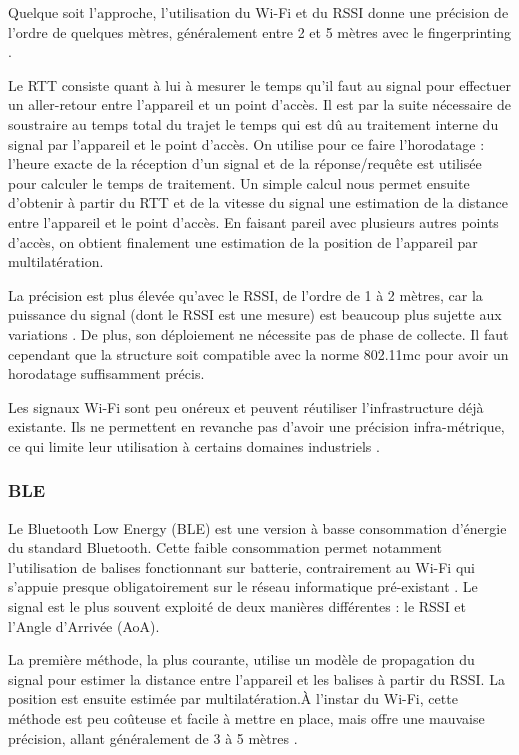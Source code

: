 \documentclass[11pt, a4paper]{article}
\begin{document}
Quelque soit l’approche, l’utilisation du Wi-Fi et du RSSI donne une précision de l’ordre de quelques mètres, généralement entre 2 et 5 mètres avec le fingerprinting \cite{daiSurveyLatestWiFi2023}.

Le RTT consiste quant à lui à mesurer le temps qu’il faut au signal pour effectuer un aller-retour entre l’appareil et un point d’accès. Il est par la suite nécessaire de soustraire au temps total du trajet le temps qui est dû au traitement interne du signal par l’appareil et le point d’accès. On utilise pour ce faire l’horodatage : l’heure exacte de la réception d’un signal et de la réponse/requête est utilisée pour calculer le temps de traitement. Un simple calcul nous permet ensuite d’obtenir à partir du RTT et de la vitesse du signal une estimation de la distance entre l’appareil et le point d’accès. En faisant pareil avec plusieurs autres points d’accès, on obtient finalement une estimation de la position de l’appareil par multilatération.

La précision est plus élevée qu’avec le RSSI, de l’ordre de 1 à 2 mètres, car la puissance du signal (dont le RSSI est une mesure) est beaucoup plus sujette aux variations \cite{bullmannComparison24GHz2020}. De plus, son déploiement ne nécessite pas de phase de collecte. Il faut cependant que la structure soit compatible avec la norme 802.11mc \cite{gentnerWiFiRTTIndoorPositioning2020} pour avoir un horodatage suffisamment précis.

Les signaux Wi-Fi sont peu onéreux et peuvent réutiliser l’infrastructure déjà existante. Ils ne permettent en revanche pas d’avoir une précision infra-métrique, ce qui limite leur utilisation à certains domaines industriels \cite{khoshrangbafExperimentalEvaluationIndoor2025}.

\subsubsection{BLE}

Le Bluetooth Low Energy (BLE) est une version à basse consommation d’énergie du standard Bluetooth. Cette faible consommation permet notamment l’utilisation de balises fonctionnant sur batterie, contrairement au Wi-Fi qui s’appuie presque obligatoirement sur le réseau informatique pré-existant \cite{sadowskiRSSIBasedIndoorLocalization2018}. Le signal est le plus souvent exploité de deux manières différentes : le RSSI et l’Angle d’Arrivée (AoA).

La première méthode, la plus courante, utilise un modèle de propagation du signal pour estimer la distance entre l’appareil et les balises à partir du RSSI. La position est ensuite estimée par multilatération.À l’instar du Wi-Fi, cette méthode est peu coûteuse et facile à mettre en place, mais offre une mauvaise précision, allant généralement de 3 à 5 mètres \cite{khoshrangbafExperimentalEvaluationIndoor2025}.
\end{document}
